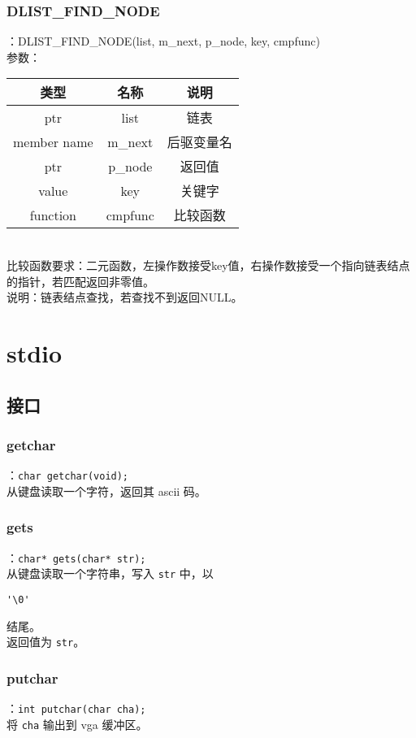 \subsubsection{DLIST\_FIND\_NODE}
：DLIST\_FIND\_NODE(list, m\_next, p\_node, key, cmpfunc)\\
参数：\\
\begin{tabular}{|c|c|c|}
    \hline
    类型 & 名称 & 说明\\\hline
    ptr & list & 链表\\\hline
    member name & m\_next & 后驱变量名\\\hline
    ptr & p\_node & 返回值\\\hline
    value & key & 关键字\\\hline
    function & cmpfunc & 比较函数\\\hline
\end{tabular}\\
比较函数要求：二元函数，左操作数接受key值，右操作数接受一个指向链表结点的指针，若匹配返回非零值。\\
说明：链表结点查找，若查找不到返回NULL。

\section{stdio}

\subsection{接口}

\subsubsection{getchar}
：\texttt{char getchar(void);} \\
从键盘读取一个字符，返回其 ascii 码。

\subsubsection{gets}
：\texttt{char* gets(char* str);} \\
从键盘读取一个字符串，写入 \texttt{str} 中，以 \begin{verbatim}'\0'\end{verbatim} 结尾。\\
返回值为 \texttt{str}。

\subsubsection{putchar}
：\texttt{int putchar(char cha);} \\
将 \texttt{cha} 输出到 vga 缓冲区。

